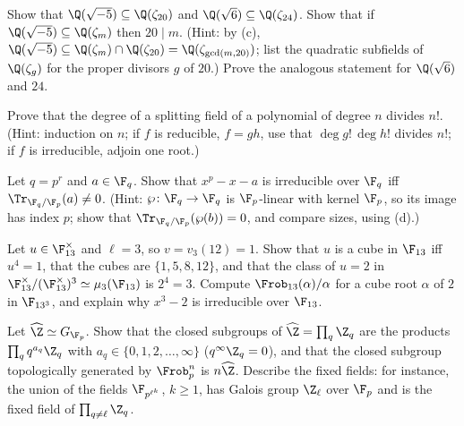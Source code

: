 \begin{exercise}\label{exer:galois:conductor}
Show that $\Q(\sqrt{-5})\subseteq\Q(\zeta_{20})$ and $\Q(\sqrt6)\subseteq\Q(\zeta_{24})$. Show that if $\Q(\sqrt{-5})\subseteq\Q(\zeta_m)$ then $20\mid m$. (Hint: by
(c), $\Q(\sqrt{-5})\subseteq\Q(\zeta_m)\cap\Q(\zeta_{20})=\Q(\zeta_{\gcd(m,20)})$; list the quadratic subfields of $\Q(\zeta_g)$ for the proper divisors
$g$ of $20$.) Prove the analogous statement for $\Q(\sqrt6)$ and $24$.
\end{exercise}

\begin{exercise}\label{exer:galois:nfactorial}
Prove that the degree of a splitting field of a polynomial of degree $n$ divides $n!$. (Hint: induction on $n$; if $f$ is reducible, $f=gh$, use that $\deg g!\,\deg h!$
divides $n!$; if $f$ is irreducible, adjoin one root.)
\end{exercise}

\begin{exercise}\label{exer:galois:artin-schreier-trace}
Let $q=p^r$ and $a\in\F_q$. Show that $x^p-x-a$ is irreducible over $\F_q$ iff $\Tr_{\F_q/\F_p}(a)\ne0$. (Hint: $\wp\colon\F_q\to\F_q$ is $\F_p$-linear with kernel $\F_p$, so its
image has index $p$; show that $\Tr_{\F_q/\F_p}(\wp(b))=0$, and compare sizes, using (d).)
\end{exercise}

\begin{exercise}\label{exer:galois:f13}
Let $u\in\F_{13}^\times$ and $\ell=3$, so $v=v_3(12)=1$. Show that $u$ is a cube in $\F_{13}$ iff $u^4=1$, that the cubes are $\{1,5,8,12\}$, and that the class of $u=2$ in
$\F_{13}^\times/(\F_{13}^\times)^3\simeq\mu_3(\F_{13})$ is $2^4=3$. Compute $\Frob_{13}(\alpha)/\alpha$ for a cube root $\alpha$ of $2$ in $\F_{13^3}$, and explain why $x^3-2$ is
irreducible over $\F_{13}$.
\end{exercise}

\begin{exercise}\label{exer:galois:supernatural}
Let $\widehat\Z\simeq G_{\F_p}$. Show that the closed subgroups of $\widehat\Z=\prod_q\Z_q$ are the products $\prod_q q^{a_q}\Z_q$ with $a_q\in\{0,1,2,\dots,\infty\}$
($q^\infty\Z_q=0$), and that the closed subgroup topologically generated by $\Frob_p^n$ is $n\widehat\Z$. Describe the fixed fields: for instance, the union of the fields
$\F_{p^{\ell^k}}$, $k\ge1$, has Galois group $\Z_\ell$ over $\F_p$ and is the fixed field of $\prod_{q\ne\ell}\Z_q$.
\end{exercise}

